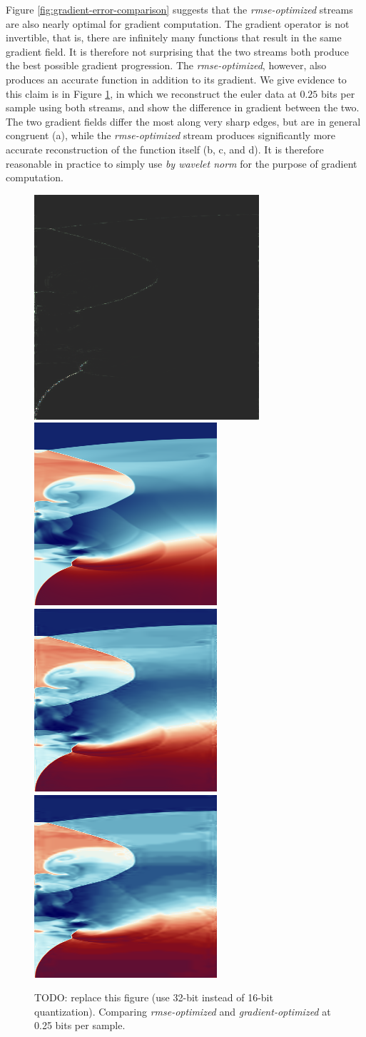 Figure \ref{fig:gradient-error-comparison} suggests that the \emph{rmse-optimized} streams are also
nearly optimal for gradient computation. The gradient operator is not invertible, that is, there are
infinitely many functions that result in the same gradient field. It is therefore not surprising
that the two streams both produce the best possible gradient progression. The \emph{rmse-optimized},
however, also produces an accurate function in addition to its gradient. We give evidence to this
claim is in Figure \ref{fig:gradient-comparison}, in which we reconstruct the euler data at $0.25$
bits per sample using both streams, and show the difference in gradient between the two. The two
gradient fields differ the most along very sharp edges, but are in general congruent (a), while the
\emph{rmse-optimized} stream produces significantly more accurate reconstruction of the function
itself (b, c, and d). It is therefore reasonable in practice to simply use \emph{by wavelet norm}
for the purpose of gradient computation.

\begin{figure}
	\centering
	{\includegraphics[width=0.24\linewidth]{img/gradient-laplacian/grad-diff.png}}
	{\includegraphics[width=0.24\linewidth]{img/gradient-laplacian/euler-original.png}}
	{\includegraphics[width=0.24\linewidth]{img/gradient-laplacian/euler-rmse.png}}
	{\includegraphics[width=0.24\linewidth]{img/gradient-laplacian/euler-gradient.png}}
	\caption{TODO: replace this figure (use 32-bit instead of 16-bit quantization). Comparing
	\emph{rmse-optimized} and \emph{gradient-optimized} at 0.25 bits per sample. }
	\label{fig:gradient-comparison}
\end{figure}

